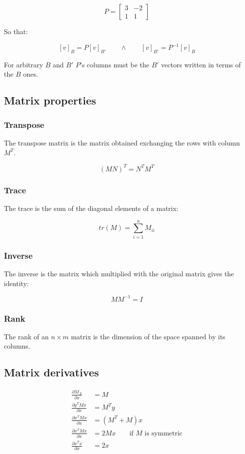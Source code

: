 		$$P = \begin{bmatrix} 3 & -2 \\ 1 & 1 \end{bmatrix}$$

		So that: 
		
		$$[v]_B = P[v]_{B'}\qquad\land\qquad [v]_{B'} = P^{-1}[v]_B$$

		For arbitrary $B$ and $B'$ $P$'s columns must be the $B'$ vectors written in terms of the $B$ ones.

	\subsection{Matrix properties}

		\subsubsection{Transpose}
		The transpose matrix is the matrix obtained exchanging the rows with column $M^T$.

		$$(MN)^T = N^TM^T$$

		\subsubsection{Trace}
		The trace is the sum of the diagonal elements of a matrix:

		$$tr(M) = \sum\limits_{i = 1}^n M_{ii}$$

		\subsubsection{Inverse}
		The inverse is the matrix which multiplied with the original matrix gives the identity:

		$$MM^{-1} = I$$

		\subsubsection{Rank}
		The rank of an $n\times m$ matrix is the dimension of the space spanned by its columns.

	\subsection{Matrix derivatives}

	\begin{align*}
		\frac{\partial M_X}{\partial x} &= M\\
		\frac{\partial y^T Mx}{\partial x} &=M^Ty\\
		\frac{\partial x^T Mx}{\partial x} &= (M^T + M)x\\
		\frac{\partial x^T Mx}{\partial x} &= 2Mx \qquad \text{if }M\text{ is symmetric}\\
		\frac{\partial x^T x}{\partial x} &= 2x
	\end{align*}

